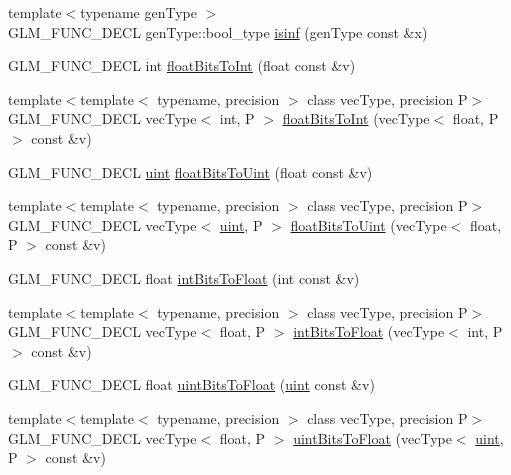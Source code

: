 \begin{DoxyCompactItemize}
\item 
{\footnotesize template$<$typename gen\+Type $>$ }\\G\+L\+M\+\_\+\+F\+U\+N\+C\+\_\+\+D\+E\+CL gen\+Type\+::bool\+\_\+type \hyperlink{group__core__func__common_ga9fce6a337c7e8ad089b9dc17c70cb873}{isinf} (gen\+Type const \&x)
\item 
G\+L\+M\+\_\+\+F\+U\+N\+C\+\_\+\+D\+E\+CL int \hyperlink{group__core__func__common_gadc6a536a7bef046c3293d2ccad6d9ca2}{float\+Bits\+To\+Int} (float const \&v)
\item 
{\footnotesize template$<$template$<$ typename, precision $>$ class vec\+Type, precision P$>$ }\\G\+L\+M\+\_\+\+F\+U\+N\+C\+\_\+\+D\+E\+CL vec\+Type$<$ int, P $>$ \hyperlink{group__core__func__common_gac4a0710238ae54c67931dd29a0b0f873}{float\+Bits\+To\+Int} (vec\+Type$<$ float, P $>$ const \&v)
\item 
G\+L\+M\+\_\+\+F\+U\+N\+C\+\_\+\+D\+E\+CL \hyperlink{group__core__precision_ga4fd29415871152bfb5abd588334147c8}{uint} \hyperlink{group__core__func__common_ga748b4d2819b48d28ca09dc8733488873}{float\+Bits\+To\+Uint} (float const \&v)
\item 
{\footnotesize template$<$template$<$ typename, precision $>$ class vec\+Type, precision P$>$ }\\G\+L\+M\+\_\+\+F\+U\+N\+C\+\_\+\+D\+E\+CL vec\+Type$<$ \hyperlink{group__core__precision_ga4fd29415871152bfb5abd588334147c8}{uint}, P $>$ \hyperlink{group__core__func__common_ga1804d4c443605d8a27be644aa461afe4}{float\+Bits\+To\+Uint} (vec\+Type$<$ float, P $>$ const \&v)
\item 
G\+L\+M\+\_\+\+F\+U\+N\+C\+\_\+\+D\+E\+CL float \hyperlink{group__core__func__common_ga2650dc57b2148a6ffbce20944fb4d97a}{int\+Bits\+To\+Float} (int const \&v)
\item 
{\footnotesize template$<$template$<$ typename, precision $>$ class vec\+Type, precision P$>$ }\\G\+L\+M\+\_\+\+F\+U\+N\+C\+\_\+\+D\+E\+CL vec\+Type$<$ float, P $>$ \hyperlink{group__core__func__common_gad21ab176dd0e6b59d923db5efca87f4e}{int\+Bits\+To\+Float} (vec\+Type$<$ int, P $>$ const \&v)
\item 
G\+L\+M\+\_\+\+F\+U\+N\+C\+\_\+\+D\+E\+CL float \hyperlink{group__core__func__common_ga97464ca9ff4267de30ea408f700d4ca8}{uint\+Bits\+To\+Float} (\hyperlink{group__core__precision_ga4fd29415871152bfb5abd588334147c8}{uint} const \&v)
\item 
{\footnotesize template$<$template$<$ typename, precision $>$ class vec\+Type, precision P$>$ }\\G\+L\+M\+\_\+\+F\+U\+N\+C\+\_\+\+D\+E\+CL vec\+Type$<$ float, P $>$ \hyperlink{group__core__func__common_ga3acab37650ecd792dc84548094b58684}{uint\+Bits\+To\+Float} (vec\+Type$<$ \hyperlink{group__core__precision_ga4fd29415871152bfb5abd588334147c8}{uint}, P $>$ const \&v)

\end{DoxyCompactItemize}
